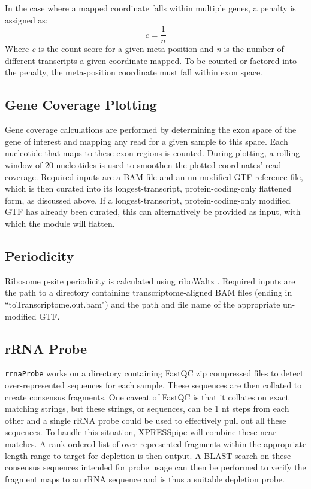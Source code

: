 \documentclass[10pt, oneside]{article}
\begin{document}
In the case where a mapped coordinate falls within multiple genes, a penalty is assigned as:
\begin{equation}
  \textit{c} = \frac{1}{\textit{n}}
\end{equation}
Where \textit{c} is the count score for a given meta-position and \textit{n} is the number of different transcripts a given coordinate mapped. To be counted or factored into the penalty, the meta-position coordinate must fall within exon space.

\subsection{Gene Coverage Plotting}
Gene coverage calculations are performed by determining the exon space of the gene of interest and mapping any read for a given sample to this space. Each nucleotide that maps to these exon regions is counted. During plotting, a rolling window of 20 nucleotides is used to smoothen the plotted coordinates' read coverage. Required inputs are a BAM file and an un-modified GTF reference file, which is then curated into its longest-transcript, protein-coding-only flattened form, as discussed above. If a longest-transcript, protein-coding-only modified GTF has already been curated, this can alternatively be provided as input, with which the module will flatten.

\subsection{Periodicity}
Ribosome p-site periodicity is calculated using riboWaltz \cite{ribowaltz}. Required inputs are the path to a directory containing transcriptome-aligned BAM files (ending in ``toTranscriptome.out.bam") and the path and file name of the appropriate un-modified GTF.

\subsection{rRNA Probe}
\texttt{rrnaProbe} works on a directory containing FastQC \cite{fastqc} zip compressed files to detect over-represented sequences for each sample. These sequences are then collated to create consensus fragments. One caveat of FastQC is that it collates on exact matching strings, but these strings, or sequences, can be 1 nt steps from each other and a single rRNA probe could be used to effectively pull out all these sequences. To handle this situation, XPRESSpipe will combine these near matches. A rank-ordered list of over-represented fragments within the appropriate length range to target for depletion is then output. A BLAST \cite{blast} search on these consensus sequences intended for probe usage can then be performed to verify the fragment maps to an rRNA sequence and is thus a suitable depletion probe.
\end{document}

